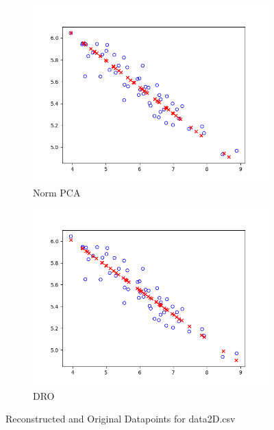 \documentclass[a4paper]{article}
\theoremstyle{definition}
\newenvironment{soln}{
    \leavevmode\color{blue}\ignorespaces
}{}
\begin{document}
\begin{itemize}
\begin{soln}
\begin{figure}[h]
\begin{subfigure}{0.5\textwidth}
            \centering
            \includegraphics[width=1.1\linewidth]{norm2D.png}
            \caption{Norm PCA}
        \label{fig:3c}
        \end{subfigure}%
        \begin{subfigure}{0.5\textwidth}
            \centering
            \includegraphics[width=1.1\linewidth]{dro2D.png}
            \caption{DRO}
        \label{fig:3d}
        \end{subfigure}
        \caption{Reconstructed and Original Datapoints for \textsf{data2D.csv}}
        \label{fig:3}
    \end{figure}
\end{soln}


\end{itemize}
\end{document}
